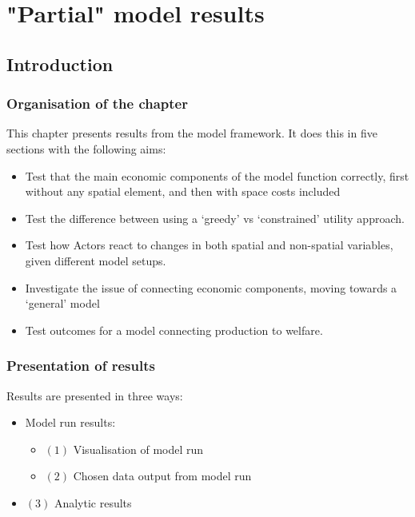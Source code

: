 \chapter{"Partial" model results \label{chapter:models}} 

\section{Introduction}

\subsection{Organisation of the chapter}

This chapter presents results from the model framework. It does this in five sections with the following aims:

\begin{itemize}
	\item Test that the main economic components of the model function correctly, first without any spatial element, and then with space costs included
	\item Test the difference between using a `greedy’ vs ‘constrained’ utility approach.
	\item Test how Actors react to changes in both spatial and non-spatial variables, given different model setups.
	\item Investigate the issue of connecting economic components, moving towards a `general’ model
	\item Test outcomes for a model connecting production to welfare.
\end{itemize}

\subsection{Presentation of results \label{sec:resultspres}}

Results are presented in three ways:

\begin{itemize}
	\item Model run results:
\begin{itemize}
	\item $(1)$ Visualisation of model run
	\item	$(2)$ Chosen data output from model run
\end{itemize}
	\item $(3)$ Analytic results
\end{itemize}

